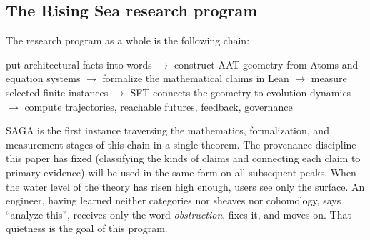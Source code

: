\subsection{The Rising Sea research program}\label{sec:96}

The research program as a whole is the following chain:
\begin{center}
\small
put architectural facts into words
$\to$ construct AAT geometry from Atoms and equation systems
$\to$ formalize the mathematical claims in Lean
$\to$ measure selected finite instances
$\to$ SFT connects the geometry to evolution dynamics
$\to$ compute trajectories, reachable futures, feedback, governance
\end{center}

SAGA is the first instance traversing the mathematics, formalization,
and measurement stages of this chain in a single theorem. The provenance discipline this paper has fixed (classifying
the kinds of claims and connecting each claim to primary evidence)
will be used in the same form on all subsequent peaks. When the water
level of the theory has risen high enough, users see only the surface.
An engineer, having learned neither categories nor sheaves nor
cohomology, says ``analyze this'', receives only the word
\emph{obstruction}, fixes it, and moves on. That quietness is the goal
of this program.
